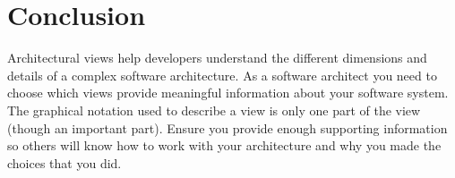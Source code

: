 \section{Conclusion}
Architectural views help developers understand the different dimensions and details of a complex software architecture.
As a software architect you need to choose which views provide meaningful information about your software system.
The graphical notation used to describe a view is only one part of the view (though an important part).
Ensure you provide enough supporting information so others will know how to work with your architecture and why you made the choices that you did.